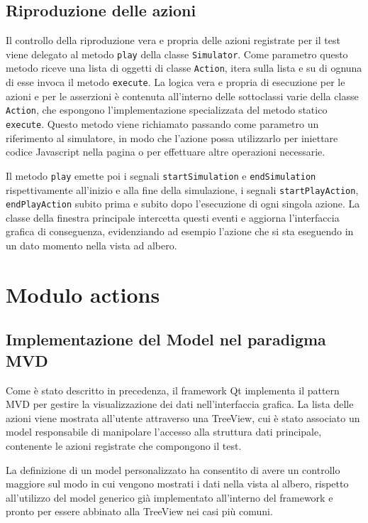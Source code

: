 \documentclass[12pt]{toptesi}
\begin{document}
\subsection{Riproduzione delle azioni}

Il controllo della riproduzione vera e propria delle azioni registrate per il test viene delegato al metodo \verb|play| della classe \verb|Simulator|. Come parametro questo metodo riceve una lista di oggetti di classe \verb|Action|, itera sulla lista e su di  ognuna di esse invoca il metodo \verb|execute|. La logica vera e propria di esecuzione per le azioni e per le asserzioni è contenuta all'interno delle sottoclassi varie della classe \verb|Action|, che espongono l'implementazione specializzata del metodo statico \verb|execute|. Questo metodo viene richiamato passando come parametro un riferimento al simulatore, in modo che l'azione possa utilizzarlo per iniettare codice Javascript nella pagina o per effettuare altre operazioni necessarie.

Il metodo \verb|play| emette poi i segnali \verb|startSimulation| e \verb|endSimulation| rispettivamente all'inizio e alla fine della simulazione, i segnali \verb|startPlayAction|, \verb|endPlayAction| subito prima e subito dopo l'esecuzione di ogni singola azione. La classe della finestra principale intercetta questi eventi e aggiorna l'interfaccia grafica di conseguenza, evidenziando ad esempio l'azione che si sta eseguendo in un dato momento nella vista ad albero.

\section{Modulo actions}

\subsection{Implementazione del Model nel paradigma MVD}

Come è stato descritto in precedenza, il framework Qt implementa il pattern MVD per gestire la visualizzazione dei dati nell'interfaccia grafica. La lista delle azioni viene mostrata all'utente attraverso una TreeView, cui è stato associato un model responsabile di manipolare l'accesso alla struttura dati principale, contenente le azioni registrate che compongono il test. 

La definizione di un model personalizzato ha consentito di avere un controllo maggiore sul modo in cui vengono mostrati i dati nella vista al albero, rispetto all'utilizzo del model generico già implementato all'interno del framework e pronto per essere abbinato alla TreeView nei casi più comuni. 
\end{document}
